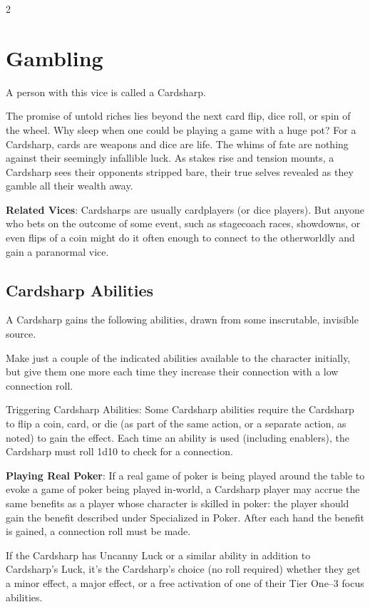 \begin{multicols}{2}

\section{Gambling}

A person with this vice is called a Cardsharp. 

The promise of untold riches lies beyond the next card flip, dice roll, or spin of the wheel. Why sleep when one could be playing a game with a huge pot? For a Cardsharp, cards are weapons and dice are life. The whims of fate are nothing against their seemingly infallible luck. As stakes rise and tension mounts, a Cardsharp sees their opponents stripped bare, their true selves revealed as they gamble all their wealth away. 

\textbf{Related Vices}: Cardsharps are usually cardplayers (or dice players). But anyone who bets on the outcome of some event, such as stagecoach races, showdowns, or even flips of a coin might do it often enough to connect to the otherworldly and gain a paranormal vice.

\subsection{Cardsharp Abilities}
 
A Cardsharp gains the following abilities, drawn from some inscrutable, invisible source. 

Make just a couple of the indicated abilities available to the character initially, but give them one more each time they increase their connection with a low connection roll. 

Triggering Cardsharp Abilities: Some Cardsharp abilities require the Cardsharp to flip a coin, card, or die (as part of the same action, or a separate action, as noted) to gain the effect. Each time an ability is used (including enablers), the Cardsharp must roll 1d10 to check for a connection. 

\textbf{Playing Real Poker}: If a real game of poker is being played around the table to evoke a game of poker being played in‑world, a Cardsharp player may accrue the same benefits as a player whose character is skilled in poker: the player should gain the benefit described under Specialized in Poker. After each hand the benefit is gained, a connection roll must be made.

If the Cardsharp has Uncanny Luck or a similar ability in addition to Cardsharp’s Luck, it’s the Cardsharp’s choice (no roll required) whether they get a minor effect, a major effect, or a free activation of one of their Tier One–3 focus abilities.


\end{multicols}
